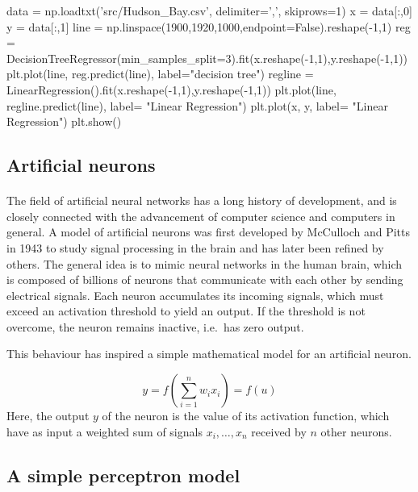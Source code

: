 \documentclass[%
oneside,                 %
final,                   %
10pt]{article}
\begin{document}
data = np.loadtxt('src/Hudson_Bay.csv', delimiter=',', skiprows=1)
x = data[:,0]
y = data[:,1]
line = np.linspace(1900,1920,1000,endpoint=False).reshape(-1,1)
reg = DecisionTreeRegressor(min_samples_split=3).fit(x.reshape(-1,1),y.reshape(-1,1))
plt.plot(line, reg.predict(line), label="decision tree")
regline = LinearRegression().fit(x.reshape(-1,1),y.reshape(-1,1))
plt.plot(line, regline.predict(line), label= "Linear Regression")
plt.plot(x, y, label= "Linear Regression")
plt.show()
\epycod





\subsection{Artificial neurons}

\paragraph{}

The field of artificial neural networks has a long history of
development, and is closely connected with the advancement of computer
science and computers in general. A model of artificial neurons was
first developed by McCulloch and Pitts in 1943 to study signal
processing in the brain and has later been refined by others. The
general idea is to mimic neural networks in the human brain, which is
composed of billions of neurons that communicate with each other by
sending electrical signals.  Each neuron accumulates its incoming
signals, which must exceed an activation threshold to yield an
output. If the threshold is not overcome, the neuron remains inactive,
i.e.~has zero output.

This behaviour has inspired a simple mathematical model for an artificial neuron.

\[
 y = f\left(\sum_{i=1}^n w_ix_i\right) = f(u)
\]
Here, the output $y$ of the neuron is the value of its activation function, which have as input
a weighted sum of signals $x_i, \dots ,x_n$ received by $n$ other neurons.



\subsection{A simple perceptron model}
\end{document}
